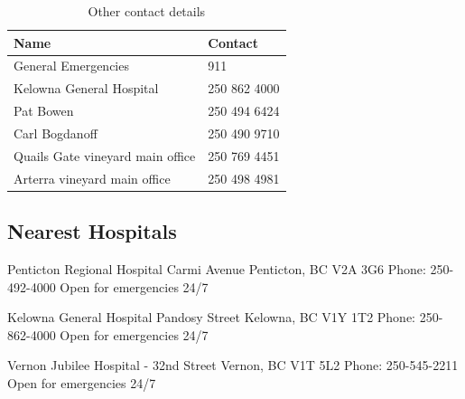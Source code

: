 \documentclass[11pt,letter]{article}
\begin{document}
\begin{table}[H]
\caption{Other contact details} %
\begin{tabular}{l l} %
\hline\hline %
Name & Contact \\ [0.5ex] %
\hline %
General Emergencies & 911 \\ %
Kelowna General Hospital & 250 862 4000 \\
Pat Bowen & 250 494 6424\\
Carl Bogdanoff & 250 490 9710 \\ %
Quails Gate vineyard main office & 250 769 4451 \\
Arterra vineyard main office & 250 498 4981\\ %

\hline %
\end{tabular}
\label{table:nonlin} %
\end{table}

\subsection {Nearest Hospitals}
Penticton Regional Hospital  Carmi Avenue\newline
Penticton, BC V2A 3G6\newline
Phone: 250-492-4000\newline
Open for emergencies 24/7\newline

Kelowna General Hospital Pandosy Street\newline
Kelowna, BC V1Y 1T2\newline
Phone: 250-862-4000\newline
Open for emergencies 24/7\newline

Vernon Jubilee Hospital - 32nd Street\newline
Vernon, BC V1T 5L2\newline
Phone: 250-545-2211\newline
Open for emergencies 24/7\newline
\end{document}
